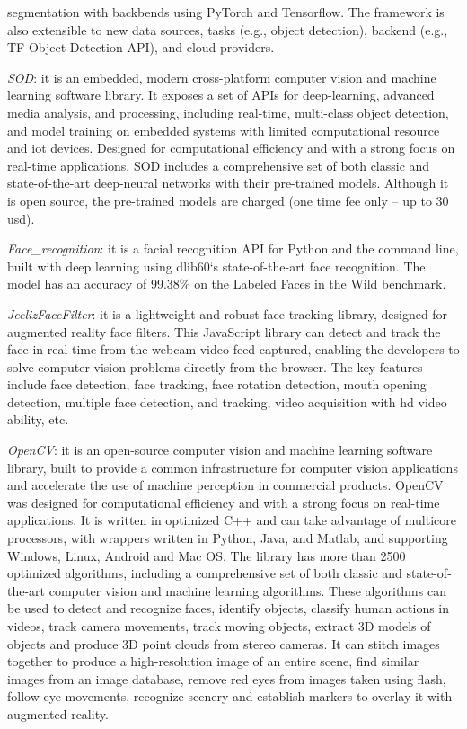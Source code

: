 \begin{enum-c}
segmentation with backbends using PyTorch and Tensorflow.
The framework is also extensible to new data sources, tasks (e.g., object
detection), backend (e.g., TF Object Detection API), and cloud providers.
\item \emph{SOD}:
it is an embedded, modern cross-platform computer vision and machine learning
software library.
It exposes a set of APIs for deep-learning, advanced media analysis, and
processing, including real-time, multi-class object detection, and model
training on embedded systems with limited computational resource and \gls{iot}
devices.
Designed for computational efficiency and with a strong focus on real-time
applications, SOD includes a comprehensive set of both classic and
state-of-the-art deep-neural networks with their pre-trained models.
Although it is open source, the pre-trained models are charged (one time fee
only -- up to 30 \gls{usd}).
\item \emph{Face\_recognition}:
  it is a facial recognition API for Python and the command line, built with
  deep learning using dlib60‘s state-of-the-art face recognition.
  The model has an accuracy of 99.38\% on the Labeled Faces in the Wild
  benchmark.
\item \emph{JeelizFaceFilter}:
it is a lightweight and robust face tracking library, designed for augmented reality face filters.
This JavaScript library can detect and track the face in real-time from the
webcam video feed captured, enabling the developers to solve computer-vision
problems directly from the browser.
The key features include face detection, face tracking, face rotation
detection, mouth opening detection, multiple face detection, and tracking, video
acquisition with \gls{hd} video ability, etc.
\item \emph{OpenCV}:
it is an open-source computer vision and machine learning software library,
built to provide a common infrastructure for computer vision applications and
accelerate the use of machine perception in commercial products.
OpenCV was designed for computational efficiency and with a strong focus on
real-time applications. It is written in optimized C++ and can take advantage of
multicore processors, with wrappers written in Python, Java, and Matlab, and
supporting Windows, Linux, Android and Mac OS.
The library has more than 2500 optimized algorithms, including a comprehensive
set of both classic and state-of-the-art computer vision and machine learning algorithms.
These algorithms can be used to detect and recognize faces, identify objects,
classify human actions in videos, track camera movements, track moving objects,
extract 3D models of objects and produce 3D point clouds from stereo cameras.
It can stitch images together to produce a high-resolution image of an entire
scene, find similar images from an image database, remove red eyes from images
taken using flash, follow eye movements, recognize scenery and establish markers to overlay it with augmented reality.
\end{enum-c}
%
%
